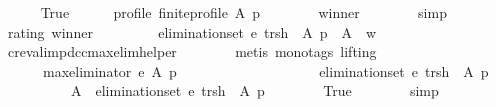 \begin{isabellebody}
\ \ \ \ \isamarkupfalse%
\ True\isanewline
\ \ \ \ \isamarkupfalse%
\ profile{\isacharcolon}{\kern0pt}\ {\isachardoublequoteopen}finite{\isacharunderscore}{\kern0pt}profile\ A\ p{\isachardoublequoteclose}\isanewline
\ \ \ \ \ \ \isamarkupfalse%
\ winner\isanewline
\ \ \ \ \ \ \isamarkupfalse%
\ simp\isanewline
\ \ \ \ \isamarkupfalse%
\ rating\ winner\ \isamarkupfalse%
\ {}{\isacharcolon}{\kern0pt}\isanewline
\ \ \ \ \ \ {\isachardoublequoteopen}{\isacharparenleft}{\kern0pt}elimination{\isacharunderscore}{\kern0pt}set\ e\ {\isacharquery}{\kern0pt}trsh\ {\isacharparenleft}{\kern0pt}{\isacharless}{\kern0pt}{\isacharparenright}{\kern0pt}\ A\ p{\isacharparenright}{\kern0pt}\ {\isacharequal}{\kern0pt}\ A\ {\isacharminus}{\kern0pt}\ {\isacharbraceleft}{\kern0pt}w{\isacharbraceright}{\kern0pt}{\isachardoublequoteclose}\isanewline
\ \ \ \ \ \ \isamarkupfalse%
\ cr{\isacharunderscore}{\kern0pt}eval{\isacharunderscore}{\kern0pt}imp{\isacharunderscore}{\kern0pt}dcc{\isacharunderscore}{\kern0pt}max{\isacharunderscore}{\kern0pt}elim{\isacharunderscore}{\kern0pt}helper{}\isanewline
\ \ \ \ \ \ \isamarkupfalse%
\ {\isacharparenleft}{\kern0pt}metis\ {\isacharparenleft}{\kern0pt}mono{\isacharunderscore}{\kern0pt}tags{\isacharcomma}{\kern0pt}\ lifting{\isacharparenright}{\kern0pt}{\isacharparenright}{\kern0pt}\isanewline
\ \ \ \ \isamarkupfalse%
\isanewline
\ \ \ \ \ \ {\isachardoublequoteopen}max{\isacharunderscore}{\kern0pt}eliminator\ e\ A\ p\ {\isacharequal}{\kern0pt}\isanewline
\ \ \ \ \ \ \ \ {\isacharparenleft}{\kern0pt}{\isacharbraceleft}{\kern0pt}{\isacharbraceright}{\kern0pt}{\isacharcomma}{\kern0pt}\isanewline
\ \ \ \ \ \ \ \ \ \ {\isacharparenleft}{\kern0pt}elimination{\isacharunderscore}{\kern0pt}set\ e\ {\isacharquery}{\kern0pt}trsh\ {\isacharparenleft}{\kern0pt}{\isacharless}{\kern0pt}{\isacharparenright}{\kern0pt}\ A\ p{\isacharparenright}{\kern0pt}{\isacharcomma}{\kern0pt}\isanewline
\ \ \ \ \ \ \ \ \ \ A\ {\isacharminus}{\kern0pt}\ {\isacharparenleft}{\kern0pt}elimination{\isacharunderscore}{\kern0pt}set\ e\ {\isacharquery}{\kern0pt}trsh\ {\isacharparenleft}{\kern0pt}{\isacharless}{\kern0pt}{\isacharparenright}{\kern0pt}\ A\ p{\isacharparenright}{\kern0pt}{\isacharparenright}{\kern0pt}{\isachardoublequoteclose}\isanewline
\ \ \ \ \ \ \isamarkupfalse%
\ True\isanewline
\ \ \ \ \ \ \isamarkupfalse%
\ simp\isanewline
\ \ \ \ \isamarkupfalse%

\end{isabellebody}
